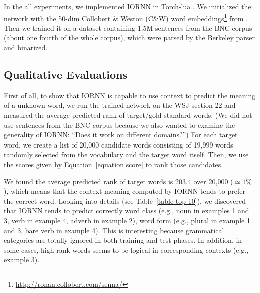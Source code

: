 \documentclass[11pt]{article}
\begin{document}
In the all experiments, we implemented IORNN in Torch-lua \cite{collobert_implementing_2012}.
We initialized the network with the 50-dim Collobert \& Weston (C\&W) word embeddings\footnote{\url{http://ronan.collobert.com/senna/}} 
from . Then we trained it on a dataset containing 1.5M sentences
from the BNC corpus (about one fourth of the whole corpus), which were parsed by 
the Berkeley parser \cite{petrov2006learning} and binarized.

\subsection{Qualitative Evaluations}
\label{subsection qualitative eval}

First of all, to show that IORNN is capable to use context to predict the meaning of a unknown word, 
we run the trained network on the WSJ section 22 and measured the average predicted rank of 
target/gold-standard words. 
(We did not use sentences from the BNC corpus because we also wanted to examine the generality of IORNN: 
``Does it work on different domains?'')
For each target word, we create a list of 20,000 candidate words 
consisting of 19,999 words randomly selected from the vocabulary and the target word itself. Then, 
we use the scores given by Equation~\ref{equation score} to rank those candidates. 

We found the average predicted rank of target words is 203.4 over 20,000 ($\simeq 1\%$), which means that 
the context meaning computed by IORNN tends to prefer the correct word. Looking into details 
(see Table~\ref{table top 10}), we discovered that IORNN tends to predict correctly word class (e.g., 
noun in examples 1 and 3, verb in example 4, adverb in example 2), word form (e.g., plural in example 1 and 3, 
bare verb in example 4). This is interesting because grammatical categories are totally ignored in both training 
and test phases. In addition, in some cases, high rank words seems to be logical in corresponding 
contexts (e.g., example 3).
\end{document}
